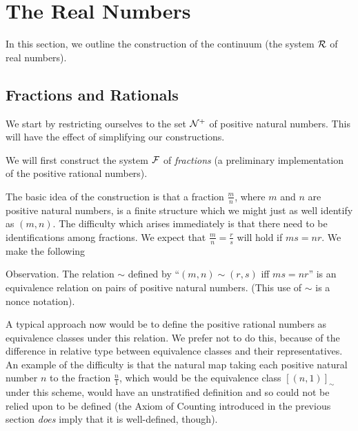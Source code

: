 \chapter{The Real Numbers}

In this section, we outline the construction of the continuum (the
system ${\cal R}$ of real numbers).



\section{Fractions and Rationals}

We start by restricting ourselves to the set ${\cal N}^+$ of positive
natural numbers.  This will have the effect of simplifying our
constructions.

We will first construct the system ${\cal F}$ of {\itshape
fractions\/} (a preliminary implementation of the positive
rational numbers).

The basic idea of the construction is that a fraction $\frac mn$,
where $m$ and $n$ are positive natural numbers, is a
finite structure 
which we might just as well identify as $(m,n)$.  The difficulty which
arises immediately is that there need to be identifications among
fractions.  We expect that $\frac mn = \frac rs$ will hold if $ms =
nr$.  We make the following


\begin{ThmEtc}{Observation.}
 The relation $\sim$ defined by ``$(m,n) \sim
 (r,s)$ iff $ms = nr$'' is an equivalence relation on pairs of positive
 natural numbers.  (This use of $\sim$ is a nonce notation).
\end{ThmEtc}

A typical approach now would be to define the positive rational numbers as equivalence classes under this relation.  We prefer not to do this, because of
the difference in relative type between
equivalence classes and their representatives.  An example of the
difficulty is that the natural map taking each positive natural number
$n$ to the fraction $\frac n1$, which would be the equivalence class
$[(n,1)]_\sim$ under this scheme, would have an
unstratified
definition and so could not be relied upon to be defined (the Axiom of
Counting introduced in the previous section {\itshape
does\/} imply that it is well-defined, though).

